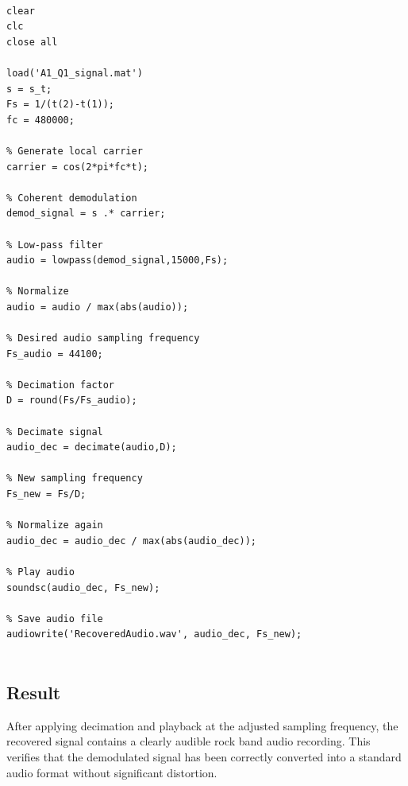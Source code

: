 \documentclass{article}
\begin{document}
\begin{lstlisting}

clear
clc
close all

load('A1_Q1_signal.mat')
s = s_t;
Fs = 1/(t(2)-t(1));
fc = 480000;

% Generate local carrier
carrier = cos(2*pi*fc*t);

% Coherent demodulation
demod_signal = s .* carrier;

% Low-pass filter
audio = lowpass(demod_signal,15000,Fs);

% Normalize
audio = audio / max(abs(audio));

% Desired audio sampling frequency
Fs_audio = 44100;

% Decimation factor
D = round(Fs/Fs_audio);

% Decimate signal
audio_dec = decimate(audio,D);

% New sampling frequency
Fs_new = Fs/D;

% Normalize again
audio_dec = audio_dec / max(abs(audio_dec));

% Play audio
soundsc(audio_dec, Fs_new);

% Save audio file
audiowrite('RecoveredAudio.wav', audio_dec, Fs_new);


\end{lstlisting}

\subsection*{Result}

After applying decimation and playback at the adjusted sampling frequency, the recovered signal contains a clearly audible rock band audio recording. This verifies that the demodulated signal has been correctly converted into a standard audio format without significant distortion.
\end{document}

